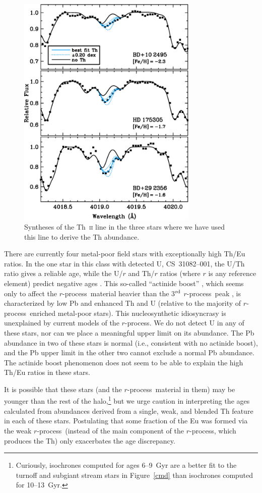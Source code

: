\documentclass{emulateapj}
\def\rpro{\mbox{$r$-process}}
\begin{document}
\begin{figure}
\includegraphics[angle=0,width=3.4in]{fig17.eps}
\caption{
\label{thoriumplot}
Syntheses of the Th~\textsc{ii} line in the three stars
where we have used this line to derive the Th abundance.
}
\end{figure}


There are currently four metal-poor field stars with exceptionally high 
Th/Eu ratios.
In the one star in this class with detected U, \mbox{CS~31082--001}, the 
U/Th ratio gives a reliable age, while the U/$r$ and Th/$r$ ratios
(where $r$ is any reference element)
predict negative ages \citep{hill02,plez04}.
This so-called ``actinide boost'' \citep{schatz02}, which seems only
to affect the \rpro\ material heavier than the 3$^{\rm rd}$ \rpro\ peak
\citep{roederer09b}, is characterized by low Pb and enhanced Th and U 
(relative to the majority of \rpro\ enriched metal-poor stars).
This nucleosynthetic idiosyncrasy is unexplained by current models of
the \rpro.
We do not detect U in any of these stars, nor can we place a 
meaningful upper limit on its abundance.
The Pb abundance in two of these stars is normal (i.e., consistent with 
no actinide boost), and the Pb upper limit in the other
two cannot exclude a normal Pb abundance.
The actinide boost phenomenon does not seem to be able to 
explain the high Th/Eu ratios in these stars.

It is possible that these stars (and the \rpro\ material in them) may
be younger than the rest of the halo,\footnote{
Curiously, isochrones computed for ages 6--9~Gyr are a better fit
to the turnoff and subgiant stream stars in Figure~\ref{cmd}
than isochrones computed for 10--13~Gyr.}
but we urge caution in
interpreting the ages calculated from abundances derived from
a single, weak, and blended Th feature in each of these stars.
Postulating that some fraction of the Eu was formed via the weak
\rpro\ (instead of the main component of the \rpro, which produces
the Th) only exacerbates the age discrepancy.
\end{document}
